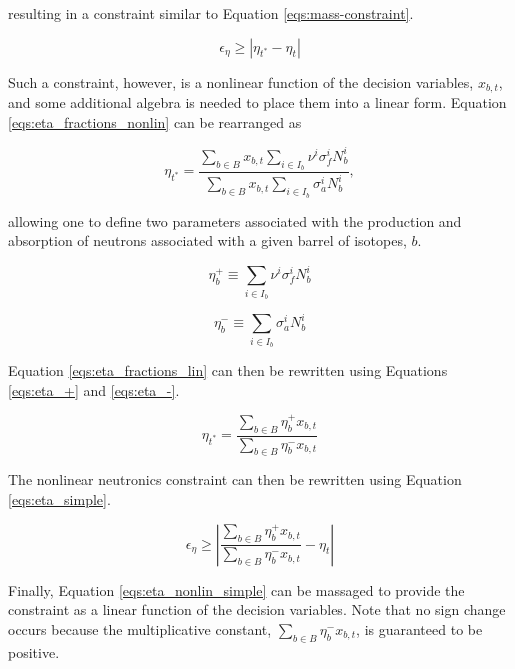 resulting in a constraint similar to Equation \ref{eqs:mass-constraint}.

\begin{equation}\label{eqs:eta-constraint-nonlin}
\epsilon_{\eta} \geq \left| \eta_{t^*} - \eta_t \right|
\end{equation}

Such a constraint, however, is a nonlinear function of the decision variables,
$x_{b,t}$, and some additional algebra is needed to place them into a linear
form. Equation \ref{eqs:eta_fractions_nonlin} can be rearranged as

\begin{equation}
\label{eqs:eta_fractions_lin}
\eta_{t^*} = \frac{\sum_{b \in B} x_{b, t} \sum_{i \in I_{b}} \nu^{i} \sigma_{f}^{i} N_{b}^{i}}
                {\sum_{b \in B} x_{b, t} \sum_{i \in I_{b}} \sigma_{a}^{i} N_{b}^{i}},
\end{equation}

allowing one to define two parameters associated with the production and
absorption of neutrons associated with a given barrel of isotopes, $b$.

\begin{equation}
\label{eqs:eta_+}
\eta_{b}^{+} \equiv \sum_{i \in I_{b}} \nu^{i} \sigma_{f}^{i} N_{b}^{i}
\end{equation}

\begin{equation}
\label{eqs:eta_-}
\eta_{b}^{-} \equiv \sum_{i \in I_{b}} \sigma_{a}^{i} N_{b}^{i}
\end{equation}

Equation \ref{eqs:eta_fractions_lin} can then be rewritten using Equations
\ref{eqs:eta_+} and \ref{eqs:eta_-}.

\begin{equation}
\label{eqs:eta_simple}
\eta_{t^*} = \frac{\sum_{b \in B} \eta_{b}^{+} x_{b, t}}
                {\sum_{b \in B} \eta_{b}^{-} x_{b, t}}
\end{equation}

The nonlinear neutronics constraint can then be rewritten using Equation
\ref{eqs:eta_simple}.

\begin{equation}
\label{eqs:eta_nonlin_simple}
\epsilon_{\eta} \geq \left| 
\frac{\sum_{b \in B} \eta_{b}^{+} x_{b,t}}
     {\sum_{b \in B} \eta_{b}^{-} x_{b,t}}
- \eta_{t} \right|
\end{equation}

Finally, Equation \ref{eqs:eta_nonlin_simple} can be massaged to provide the
constraint as a linear function of the decision variables. Note that no sign
change occurs because the multiplicative constant, $\sum_{b \in B} \eta_{b}^{-}
x_{b,t}$, is guaranteed to be positive.

